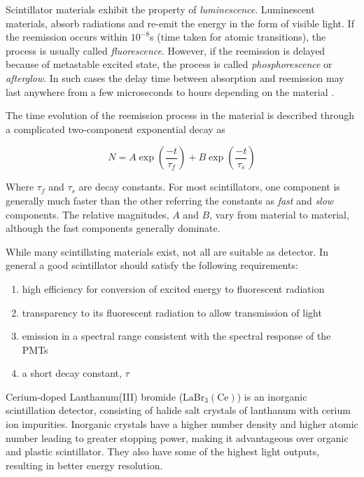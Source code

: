 Scintillator materials exhibit the property of \textit{luminescence}. Luminescent materials, absorb radiations and re-emit the energy in the form of visible light. If the reemission occurs within $10^{-8}$s (time taken for  atomic transitions), the process is usually called \textit{fluorescence}. However, if the reemission is delayed because of metastable excited state, the process is called \textit{phosphorescence} or \textit{afterglow}. In such cases the delay time between absorption and reemission may last anywhere from a few microseconds to hours depending on the material \cite{leo_scintillation}.

The time evolution of the reemission process in the material is described through a complicated two-component exponential decay as

\begin{equation}
    N = A \exp(\frac{-t}{\tau_f}) + B \exp(\frac{-t}{\tau_s})
\end{equation}

Where $\tau_f$ and $\tau_s$ are decay constants. For most scintillators, one component is generally much faster than the other referring the constants as \textit{fast} and \textit{slow} components. The relative magnitudes, $A$ and $B$, vary from material to material, although the fast components generally dominate. 

While many scintillating materials exist, not all are suitable as detector. In general a good scintillator should satisfy the following requirements:

\begin{enumerate}
    \item high efficiency for conversion of excited energy to fluorescent radiation
    \item transparency to its fluorescent radiation to allow transmission of light
    \item emission in a spectral range consistent with the spectral response of the PMTs
    \item a short decay constant, $\tau$
\end{enumerate}

Cerium-doped Lanthanum(III) bromide ($\mathrm{LaBr}_3\mathrm{(Ce)}$) is an inorganic scintillation detector, consisting of halide salt crystals of lanthanum with cerium ion impurities. Inorganic crystals have a higher number density and higher atomic number leading to greater stopping power, making it advantageous over organic and plastic scintillator. They also have some of the highest light outputs, resulting in better energy resolution. 

